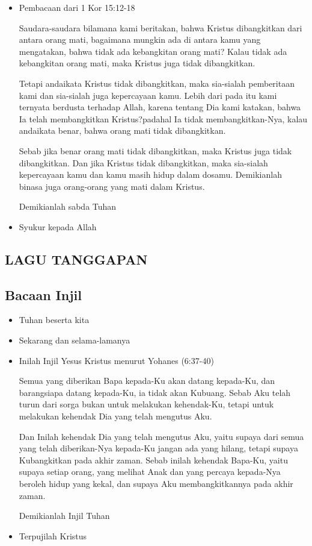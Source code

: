 \documentclass[a5paper,headsepline,titlepage,11pt,nnormalheadings,DIVcalc]{scrbook}
\newcommand{\BU}[1]{\begin{itemize} \item[U:] #1 \end{itemize}}
\newcommand{\BP}[1]{\begin{itemize} \item[P:] #1 \end{itemize}}
\begin{document}
\BP{Pembacaan dari 1 Kor 15:12-18 

Saudara-saudara bilamana kami beritakan, bahwa Kristus dibangkitkan dari antara orang mati, bagaimana mungkin ada di antara kamu yang mengatakan, bahwa tidak ada kebangkitan orang mati?
Kalau tidak ada kebangkitan orang mati, maka Kristus juga tidak dibangkitkan.

Tetapi andaikata Kristus tidak dibangkitkan, maka sia-sialah pemberitaan kami dan sia-sialah juga kepercayaan kamu.
Lebih dari pada itu kami ternyata berdusta terhadap Allah, karena tentang Dia kami katakan, bahwa Ia telah membangkitkan Kristus?padahal Ia tidak membangkitkan-Nya, kalau andaikata benar, bahwa orang mati tidak dibangkitkan.

Sebab jika benar orang mati tidak dibangkitkan, maka Kristus juga tidak dibangkitkan.
Dan jika Kristus tidak dibangkitkan, maka sia-sialah kepercayaan kamu dan kamu masih hidup dalam dosamu.
Demikianlah binasa juga orang-orang yang mati dalam Kristus. 

Demikianlah sabda Tuhan }

\BU{Syukur kepada Allah} 

\subsection*{LAGU TANGGAPAN} 

\subsection*{Bacaan Injil} 

\BP{Tuhan beserta kita} 
\BU{Sekarang dan selama-lamanya} 
\BP{Inilah Injil Yesus Kristus menurut Yohanes (6:37-40) 

Semua yang diberikan Bapa kepada-Ku akan datang kepada-Ku, dan barangsiapa datang kepada-Ku, ia tidak akan Kubuang.
Sebab Aku telah turun dari sorga bukan untuk melakukan kehendak-Ku, tetapi untuk melakukan kehendak Dia yang telah mengutus Aku.

Dan Inilah kehendak Dia yang telah mengutus Aku, yaitu supaya dari semua yang telah diberikan-Nya kepada-Ku jangan ada yang hilang, tetapi supaya Kubangkitkan pada akhir zaman.
Sebab inilah kehendak Bapa-Ku, yaitu supaya setiap orang, yang melihat Anak dan yang percaya kepada-Nya beroleh hidup yang kekal, dan supaya Aku membangkitkannya pada akhir zaman.

Demikianlah Injil Tuhan} 

\BU{Terpujilah Kristus}
\end{document}

